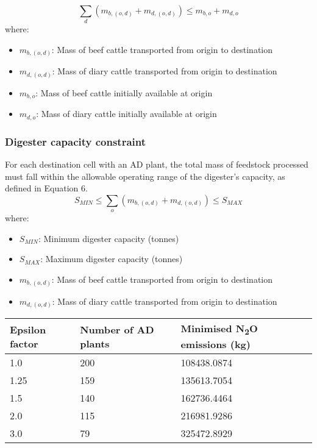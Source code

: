 \documentclass[12pt]{article}
\begin{document}
\begin{equation}
  \sum_d (m_{b, (o, d)} + m_{d, (o, d)}) \leq m_{b,o} + m_{d,o}
\end{equation}
where:
\begin{itemize}
  \item $m_{b, (o, d)}$: Mass of beef cattle transported from origin to destination
  \item $m_{d, (o, d)}$: Mass of diary cattle transported from origin to destination
  \item $m_{b,o}$: Mass of beef cattle initially available at origin
  \item $m_{d,o}$: Mass of diary cattle initially available at origin
\end{itemize}

\subsubsection*{Digester capacity constraint}
For each destination cell with an AD plant, the total mass of feedstock processed must fall within the allowable operating range of the digester’s capacity, as defined in Equation 6.
\begin{equation}
  S_{MIN} \leq \sum_o (m_{b, (o, d)} + m_{d, (o, d)}) \leq S_{MAX}
\end{equation}
where:
\begin{itemize}
  \item $S_{MIN}$: Minimum digester capacity (tonnes)
  \item $S_{MAX}$: Maximum digester capacity (tonnes)
  \item $m_{b, (o, d)}$: Mass of beef cattle transported from origin to destination
  \item $m_{d, (o, d)}$: Mass of diary cattle transported from origin to destination
\end{itemize}

\begin{center}
  \begin{tabular}{|p{3cm} | p{5cm} | p{6cm}|}
  \hline
\rowcolor{gray!30}
  Epsilon factor &  Number of AD plants & Minimised N\textsubscript{2}O emissions (kg) \\ \hline
  1.0 &  200 & 108438.0874 \\ \hline
  1.25 &  159 & 135613.7054 \\ \hline
  1.5 &  140 & 162736.4464 \\ \hline
  2.0 &  115 & 216981.9286 \\ \hline
  3.0 &  79 & 325472.8929 \\ \hline
  \end{tabular}
\end{center}
\end{document}
